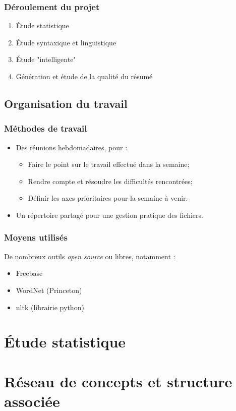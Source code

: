 \documentclass{beamer}
\begin{document}
\begin{frame}
\frametitle{Déroulement du projet}

\begin{enumerate}
\item Étude statistique
\item Étude syntaxique et linguistique
\item Étude "intelligente"
\item Génération et étude de la qualité du résumé
\end{enumerate}

\end{frame}

\subsection{Organisation du travail}

\begin{frame}
\frametitle{Méthodes de travail}
	\begin{itemize}
		\item Des réunions hebdomadaires, pour :
		\begin{itemize}
			\item Faire le point sur le travail effectué dans la semaine;
			\item Rendre compte et résoudre les difficultés rencontrées;
			\item Définir les axes prioritaires pour la semaine à venir.
		\end{itemize}
		\item Un répertoire partagé pour une gestion pratique des fichiers.
	\end{itemize}
\end{frame}

\begin{frame}
\frametitle{Moyens utilisés}

De nombreux outils \textit{open source} ou libres, notamment :
\begin{itemize}
 \item Freebase
 \item WordNet (Princeton)
 \item nltk (librairie python)
\end{itemize}
\end{frame}



\section{Étude statistique}%

\section{Réseau de concepts et structure associée}%
	

	
\end{document}
